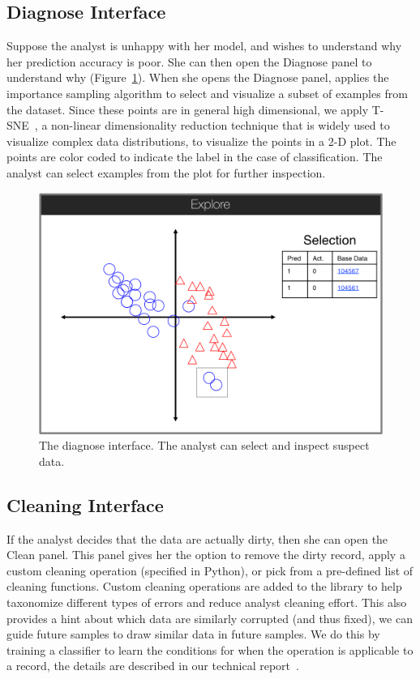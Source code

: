 \subsection{Diagnose Interface}
Suppose the analyst is unhappy with her model, and wishes to understand why her prediction accuracy is poor.
She can then open the \textsf{Diagnose} panel to understand why (Figure~\ref{diag}).
When she opens the \textsf{Diagnose} panel, \sys applies the importance sampling algorithm to select and visualize a subset of examples from the dataset.
Since these points are in general high dimensional, we apply T-SNE~\cite{van2008visualizing},
a non-linear dimensionality reduction technique that is widely used to visualize complex data distributions,
to visualize the points in a 2-D plot.
The points are color coded to indicate the label in the case of classification.
The analyst can select examples from the plot for further inspection.

\begin{figure}[t]
\centering
 \includegraphics[width=0.5\columnwidth]{figs/interface3.png}
 \caption{The diagnose interface. The analyst can select and inspect suspect data. \label{diag}}
\end{figure}

\subsection{Cleaning Interface}
If the analyst decides that the data are actually dirty, then she can open the \textsf{Clean} panel.
This panel gives her the option to remove the dirty record, apply a custom cleaning operation (specified in Python), or pick from a pre-defined list of cleaning functions.
Custom cleaning operations are added to the library to help taxonomize different types of errors and reduce analyst cleaning effort.
This also provides a hint about which data are similarly corrupted (and thus fixed), we can guide future samples to draw similar data in future samples.
We do this by training a classifier to learn the conditions for when the operation is applicable to a record, the details are described in our technical report~\cite{activecleanarxiv}.

